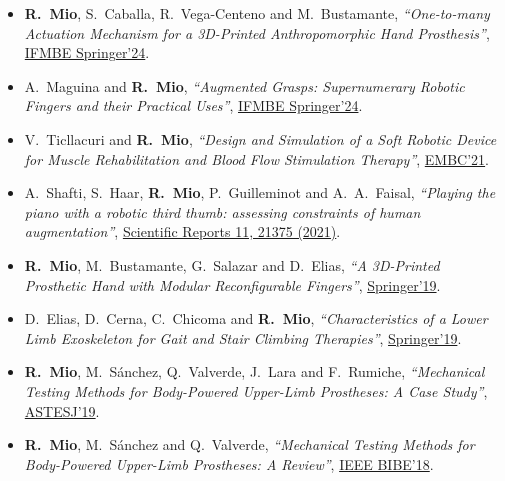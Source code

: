 \documentclass[a4paper,10pt]{article}
\begin{document}
\begin{itemize}
  \item \textbf{R.\ Mio}, S.\ Caballa, R.\ Vega-Centeno and M.\ Bustamante,
        \textit{``One-to-many Actuation Mechanism for a 3D-Printed Anthropomorphic Hand
        Prosthesis''},
        \href{https://link.springer.com/chapter/10.1007/978-3-031-49407-9_62}{IFMBE Springer'24}.

  \item A.\ Maguina and \textbf{R.\ Mio},
        \textit{``Augmented Grasps: Supernumerary Robotic Fingers and their Practical Uses''},
        \href{https://link.springer.com/chapter/10.1007/978-3-031-49407-9_52}{IFMBE Springer'24}.

  \item V.\ Ticllacuri and \textbf{R.\ Mio},
        \textit{``Design and Simulation of a Soft Robotic Device for Muscle Rehabilitation and
        Blood Flow Stimulation Therapy''},
        \href{https://ieeexplore.ieee.org/document/9630974}{EMBC'21}.

  \item A.\ Shafti, S.\ Haar, \textbf{R.\ Mio}, P.\ Guilleminot and A.\ A.\ Faisal,
        \textit{``Playing the piano with a robotic third thumb: assessing constraints of human
        augmentation''},
        \href{https://www.nature.com/articles/s41598-021-00376-6}{Scientific Reports 11, 21375 (2021)}.

  \item \textbf{R.\ Mio}, M.\ Bustamante, G.\ Salazar and D.\ Elias,
        \textit{``A 3D-Printed Prosthetic Hand with Modular Reconfigurable Fingers''},
        \href{https://link.springer.com/chapter/10.1007/978-3-030-16423-2_9}{Springer'19}.

  \item D.\ Elias, D.\ Cerna, C.\ Chicoma and \textbf{R.\ Mio},
        \textit{``Characteristics of a Lower Limb Exoskeleton for Gait and Stair Climbing
        Therapies''},
        \href{https://link.springer.com/chapter/10.1007/978-3-030-16423-2_8}{Springer'19}.

  \item \textbf{R.\ Mio}, M.\ S\'anchez, Q.\ Valverde, J.\ Lara and F.\ Rumiche,
        \textit{``Mechanical Testing Methods for Body-Powered Upper-Limb Prostheses: A Case
        Study''},
        \href{https://astesj.com/v04/i05/p08/}{ASTESJ'19}.

  \item \textbf{R.\ Mio}, M.\ S\'anchez and Q.\ Valverde,
        \textit{``Mechanical Testing Methods for Body-Powered Upper-Limb Prostheses: A Review''},
        \href{https://ieeexplore.ieee.org/document/8567479}{IEEE BIBE'18}.


\end{itemize}
\end{document}
